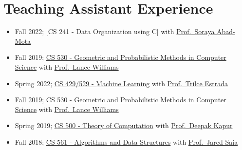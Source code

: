 \section{Teaching Assistant Experience}

\begin{itemize}
\item
  Fall 2022; {[}CS 241 - Data Organization using C{]} with
  \href{https://www.cs.unm.edu/directory/faculty-profiles/soraya-abad-mota.html}{Prof.~Soraya
  Abad-Mota}
\item
  Fall 2019; \href{https://www.cs.unm.edu/~williams/cs530f15.html}{CS
  530 - Geometric and Probabilistic Methods in Computer Science} with
  \href{https://www.cs.unm.edu/~williams/}{Prof.~Lance Williams}
\item
  Spring 2022; \href{https://www.cs.unm.edu/~estrada/cs529.php}{CS
  429/529 - Machine Learning} with
  \href{https://www.cs.unm.edu/~estrada/}{Prof.~Trilce Estrada}
\item
  Fall 2019; \href{https://www.cs.unm.edu/~williams/cs530f15.html}{CS
  530 - Geometric and Probabilistic Methods in Computer Science} with
  \href{https://www.cs.unm.edu/~williams/}{Prof.~Lance Williams}
\item
  Spring 2019; \href{https://www.cs.unm.edu/~saia/classes/561-f18/}{CS
  500 - Theory of Computation} with
  \href{https://www.cs.unm.edu/~kapur/}{Prof.~Deepak Kapur}
\item
  Fall 2018; \href{https://www.cs.unm.edu/~saia/classes/561-f18/}{CS 561
  - Algorithms and Data Structures} with
  \href{https://www.cs.unm.edu/~saia/}{Prof.~Jared Saia}
\end{itemize}

